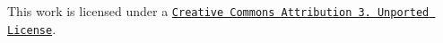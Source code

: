 \href{http://creativecommons.org/licenses/by/3.0/deed.en_US}{\tt }\par
This work is licensed under a \href{http://creativecommons.org/licenses/by/3.0/deed.en_US}{\tt Creative Commons Attribution 3. Unported License}. 